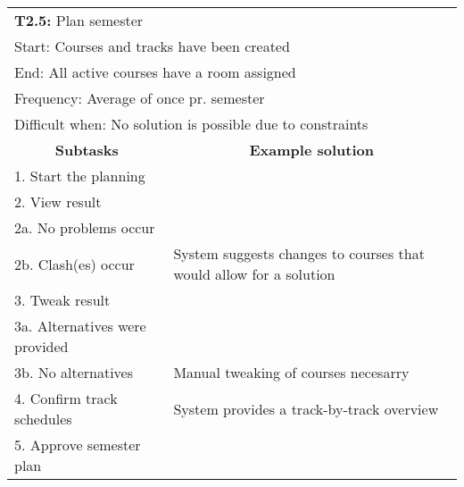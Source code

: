 \newline
\vspace{1cm}
\newline
\begin{tabular}{|p{6cm}|p{6cm}|}
\hline 
	\multicolumn{2}{|l|}{\textbf{T2.5:} \hspace{26mm}Plan semester} \\
	\multicolumn{2}{|l|}{Start: \hspace{26mm}Courses and tracks have been created} \\
	\multicolumn{2}{|l|}{End: \hspace{28mm}All active courses have a room assigned} \\
	\multicolumn{2}{|l|}{Frequency: \hspace{17mm}Average of once pr. semester} \\
	\multicolumn{2}{|l|}{Difficult when: \hspace{10mm}No solution is possible due to constraints } \\ \hline
	\multicolumn{1}{|c|}{\textbf{Subtasks}} & \multicolumn{1}{c|}{\textbf{Example solution}} \\ \hline
	1. Start the planning & \\ \hline
	2. View result & \\
	2a. No problems occur & \\
	2b. Clash(es) occur & System suggests changes to courses that would allow for a solution \\ \hline
	3. Tweak result & \\
	3a. Alternatives were provided & \\
	3b. No alternatives & Manual tweaking of courses necesarry \\ \hline
	4. Confirm track schedules & System provides a track-by-track overview \\ \hline
	5. Approve semester plan & \\ \hline
\end{tabular}

